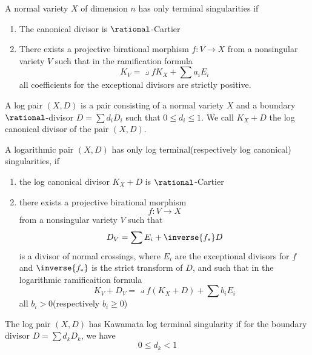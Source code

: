 \documentclass{article}
\begin{document}
\begin{definition}
A normal variety $X$ of dimension $n$ has only terminal singularities if
\begin{enumerate}
\item The canonical divisor is $\rational$-Cartier
\item There exists a projective birational morphism $f: V \rightarrow X$ from
    a nonsingular variety $V$ such that in the ramification formula
\[
    K_V = \pullback{f}K_X + \sum a_iE_i
\]
all coefficients for the exceptional divisors are strictly positive.
\end{enumerate}
\end{definition}

\begin{definition}
A log pair $(X, D)$ is a pair consisting of a normal variety $X$ and a boundary
$\rational$-divisor $D = \sum d_iD_i$ such that $0 \le d_i \le 1$. We call
$K_X + D$ the log canonical divisor of the pair $(X, D)$.
\end{definition}


\begin{definition}
A logarithmic pair $(X, D)$ has only log terminal(respectively log canonical) 
singularities, if 
\begin{enumerate}
\item the log canonical divisor $K_X + D$ is $\rational$-Cartier
\item there exists a projective birational morphism
\[
    f: V \rightarrow X
\]
from a nonsingular variety $V$ such that
\[
    D_V = \sum E_i + \inverse{f_*}D
\]
is a divisor of normal crossings, where $E_i$ are the exceptional divisors
for $f$ and $\inverse{f_*}$ is the strict transform of $D$, and such that
in the logarithmic ramificaition formula
\[
    K_V + D_V = \pullback{f}(K_X + D) + \sum b_iE_i
\]
all $b_i >0$(respectively $b_i \ge 0$)
\end{enumerate}
\end{definition}

\begin{definition}
The log pair $(X, D)$ has Kawamata log terminal singularity if for the boundary 
divisor $D = \sum d_kD_k$, we have 
\[
    0 \le d_k < 1
\]
\end{definition}
\end{document}
